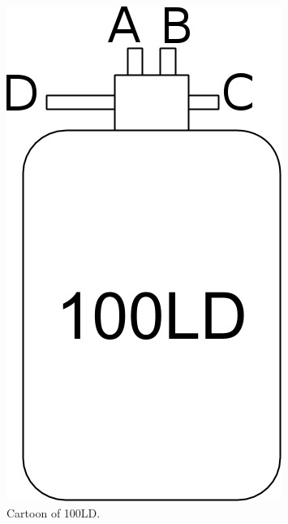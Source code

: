\begin{figure}[!htbp]
\begin{minipage}{.40\textwidth}
 \includegraphics[width=\textwidth]{./img/100LD-cartoon.jpg}
 \caption{Cartoon of 100LD.}
 \label{fig:100LD-cartoon}
 \end{minipage}
 \quad
\end{figure}

